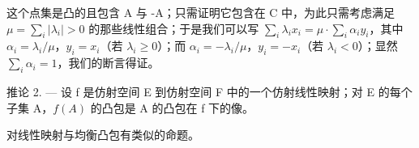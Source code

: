 这个点集是凸的且包含 A 与 -A；只需证明它包含在 C 中，为此只需考虑满足 \(\mu = \sum_{i} |\lambda_{i}| > 0\) 的那些线性组合；于是我们可以写 \(\sum_{i} \lambda_{i} x_{i} = \mu \cdot \sum_{i} \alpha_{i} y_{i}\)，其中 \(\alpha_{i} = \lambda_{i} / \mu\)，\(y_{i} = x_{i}\)（若 \(\lambda_{i} \geqslant 0\)）；而 \(\alpha_{i} = -\lambda_{i} / \mu\)，\(y_{i} = -x_{i}\)（若 \(\lambda_{i} < 0\)）；显然 \(\sum_{i} \alpha_{i} = 1\)，我们的断言得证。

推论 2. --- 设 f 是仿射空间 E 到仿射空间 F 中的一个仿射线性映射；对 E 的每个子集 A，\(f(A)\) 的凸包是 A 的凸包在 f 下的像。

对线性映射与均衡凸包有类似的命题。

